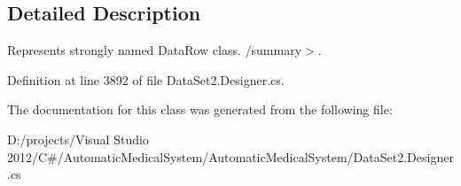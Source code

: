 \subsection{Detailed Description}
Represents strongly named DataRow class. /summary$>$. 

Definition at line 3892 of file DataSet2.Designer.cs.

The documentation for this class was generated from the following file:\begin{CompactItemize}
\item 
D:/projects/Visual Studio 2012/C\#/AutomaticMedicalSystem/AutomaticMedicalSystem/DataSet2.Designer.cs\end{CompactItemize}
